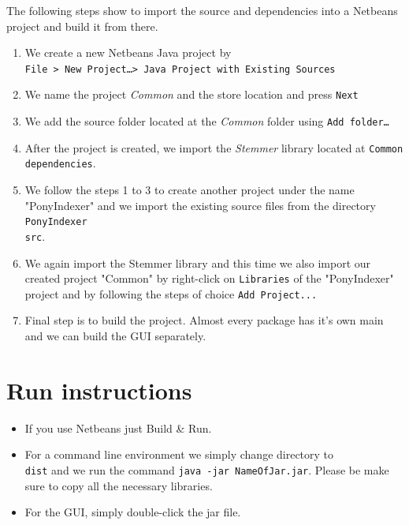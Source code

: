 \documentclass[letterpaper,10pt]{article}
\begin{document}
The following steps show to import the source and dependencies into a Netbeans project and build it from there.

\begin{enumerate}
	\item We create a new Netbeans Java project by \\
				{\tt File > New Project\ldots  > Java Project with Existing Sources }
	\item We name the project \emph{ Common} and the store location and press
				{\tt Next}
	\item We add the source folder located at the \emph{ Common} folder
				using {\tt Add folder\ldots}
	\item After the project is created, we import the \emph{ Stemmer} library
				located at {\tt Common\\dependencies}.
	\item We follow the steps 1 to 3 to create another project under the name "PonyIndexer" and we import the existing source files from the directory {\tt PonyIndexer\\src}.
	\item We again import the Stemmer library and this time we also import our created project "Common" by right-click on {\tt Libraries} of the "PonyIndexer" project and by following the steps of choice {\tt Add Project...}
	\item Final step is to build the project. Almost every package has it's own main and we can build the GUI separately.
\end{enumerate}

\section{Run instructions}
\begin{itemize}
	\item If you use Netbeans just Build \& Run.
	\item For a command line environment we simply change directory to {\tt \\dist} and we run the command {\tt java -jar NameOfJar.jar}. Please be make sure to copy all the necessary libraries.
	\item For the GUI, simply double-click the jar file.
\end{itemize}
\end{document}
